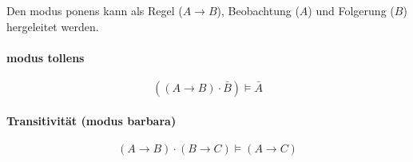 \documentclass[../main.tex]{subfiles}
\begin{document}
            Den modus ponens kann als Regel ($A \rightarrow B$), Beobachtung ($A$) und Folgerung ($B$) hergeleitet werden.
        
        \paragraph{modus tollens}
            \begin{equation}
                ((A \rightarrow B) \cdot \bar{B}) \models \bar{A}
            \end{equation}
        
        \paragraph{Transitivität (modus barbara)}
            \begin{equation}
                (A \rightarrow B) \cdot (B \rightarrow C) \models (A \rightarrow C)
            \end{equation}
\end{document}
